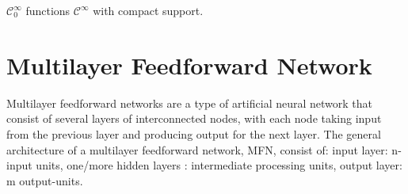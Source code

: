 \documentclass[../main.tex]{subfiles}
\begin{document}
\begin{definition} 
	$ \mathcal{C}^\infty_0$ functions $\mathcal{C}^\infty$ with compact support.  
\end{definition}

\section{Multilayer Feedforward Network}
\noindent Multilayer feedforward networks are a type of artificial neural network that consist of several layers of interconnected nodes, with each node taking input from the previous layer and producing output for the next layer. The general architecture of a multilayer feedforward network, MFN, consist of: input layer: n-input units,  one/more hidden layers : intermediate processing units, output layer: m output-units. 
\end{document}
